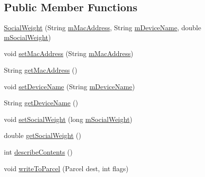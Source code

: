 \subsection*{Public Member Functions}
\begin{DoxyCompactItemize}
\item 
\hyperlink{classcom_1_1copelabs_1_1oiframework_1_1socialproximity_1_1_social_weight_adb73b95da859d4f5141ad6e193a3a12a}{Social\+Weight} (String \hyperlink{classcom_1_1copelabs_1_1oiframework_1_1socialproximity_1_1_social_weight_a93b91c868be4a9d3e395d46242ab96c4}{m\+Mac\+Address}, String \hyperlink{classcom_1_1copelabs_1_1oiframework_1_1socialproximity_1_1_social_weight_a6fa473ff39400696fd831ca519170610}{m\+Device\+Name}, double \hyperlink{classcom_1_1copelabs_1_1oiframework_1_1socialproximity_1_1_social_weight_a4c005dbeda3565c7049babdb95a391c7}{m\+Social\+Weight})
\item 
void \hyperlink{classcom_1_1copelabs_1_1oiframework_1_1socialproximity_1_1_social_weight_ab219dfa486cb5220a3904869a4d485d1}{set\+Mac\+Address} (String \hyperlink{classcom_1_1copelabs_1_1oiframework_1_1socialproximity_1_1_social_weight_a93b91c868be4a9d3e395d46242ab96c4}{m\+Mac\+Address})
\item 
String \hyperlink{classcom_1_1copelabs_1_1oiframework_1_1socialproximity_1_1_social_weight_ae53f2525ef0342baf9caabf0dbd55002}{get\+Mac\+Address} ()
\item 
void \hyperlink{classcom_1_1copelabs_1_1oiframework_1_1socialproximity_1_1_social_weight_aa56d5e6bbbb7a4a4676ca0ff89aea0e7}{set\+Device\+Name} (String \hyperlink{classcom_1_1copelabs_1_1oiframework_1_1socialproximity_1_1_social_weight_a6fa473ff39400696fd831ca519170610}{m\+Device\+Name})
\item 
String \hyperlink{classcom_1_1copelabs_1_1oiframework_1_1socialproximity_1_1_social_weight_a6f29943fc1123265d1ec1db3ceedd432}{get\+Device\+Name} ()
\item 
void \hyperlink{classcom_1_1copelabs_1_1oiframework_1_1socialproximity_1_1_social_weight_aa5fa343807ff1f465f49c60afe44808b}{set\+Social\+Weight} (long \hyperlink{classcom_1_1copelabs_1_1oiframework_1_1socialproximity_1_1_social_weight_a4c005dbeda3565c7049babdb95a391c7}{m\+Social\+Weight})
\item 
double \hyperlink{classcom_1_1copelabs_1_1oiframework_1_1socialproximity_1_1_social_weight_a3c360d68d35c9c141c1c8ba607a3b75a}{get\+Social\+Weight} ()
\item 
int \hyperlink{classcom_1_1copelabs_1_1oiframework_1_1socialproximity_1_1_social_weight_aca75f57e8d095eb7983ea4763c7f1f84}{describe\+Contents} ()
\item 
void \hyperlink{classcom_1_1copelabs_1_1oiframework_1_1socialproximity_1_1_social_weight_a043b33d2870a86e0b5917caee1998011}{write\+To\+Parcel} (Parcel dest, int flags)
\end{DoxyCompactItemize}
